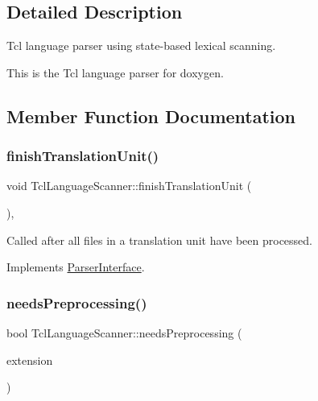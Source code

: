 \subsection{Detailed Description}
Tcl language parser using state-\/based lexical scanning. 

This is the Tcl language parser for doxygen. 

\subsection{Member Function Documentation}
\mbox{\label{class_tcl_language_scanner_a187804b0bf0a0043bad0f1a752224909}} 
\subsubsection{\texorpdfstring{finishTranslationUnit()}{finishTranslationUnit()}}
{\footnotesize\ttfamily void Tcl\+Language\+Scanner\+::finish\+Translation\+Unit (\begin{DoxyParamCaption}{ }\end{DoxyParamCaption})\hspace{0.3cm}{\ttfamily [inline]}, {\ttfamily [virtual]}}

Called after all files in a translation unit have been processed. 

Implements \mbox{\hyperlink{class_parser_interface_af3acd64c6a33852e2e46e7288eb9c9cf}{Parser\+Interface}}.

\mbox{\label{class_tcl_language_scanner_ab3a4ec9c04dbcf8bb75cd1552c774f5e}} 
\subsubsection{\texorpdfstring{needsPreprocessing()}{needsPreprocessing()}}
{\footnotesize\ttfamily bool Tcl\+Language\+Scanner\+::needs\+Preprocessing (\begin{DoxyParamCaption}\item[{const \mbox{\hyperlink{class_q_c_string}{Q\+C\+String}} \&}]{extension }\end{DoxyParamCaption})\hspace{0.3cm}{\ttfamily [virtual]}}

